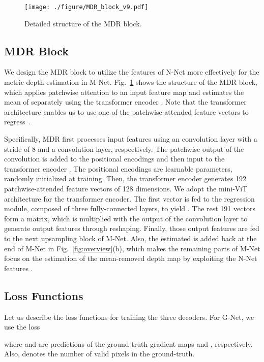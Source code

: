 \documentclass[runningheads]{llncs}
\begin{document}
\begin{figure}[!t]
    \centering
    \texttt{[image: ./figure/MDR\_block\_v9.pdf]}
    \caption{Detailed structure of the MDR block.}
    \label{fig:MDR_block}
\end{figure}

\subsection{MDR Block}
\label{sec:MDR_Block}
We design the MDR block to utilize the features  of N-Net more effectively for the metric depth estimation in M-Net. Fig.~\ref{fig:MDR_block} shows the structure of the MDR block, which applies patchwise attention to an input feature map and estimates the mean  of  separately using the transformer encoder \cite{dosovitskiy2020image}. Note that the transformer architecture enables us to use one of the patchwise-attended feature vectors to regress~.

Specifically, MDR first processes input features using an  convolution layer with a stride of 8 and a  convolution layer, respectively. The patchwise output of the  convolution is added to the positional encodings and then input to the transformer encoder \cite{dosovitskiy2020image}. The positional encodings are learnable parameters, randomly initialized at training. Then, the transformer encoder generates 192 patchwise-attended feature vectors of 128 dimensions. We adopt the mini-ViT architecture \cite{bhat2021adabins} for the transformer encoder. The first vector is fed to the regression module, composed of three fully-connected layers, to yield . The rest 191 vectors form a matrix, which is multiplied with the output of the  convolution layer to generate  output features through reshaping. Finally, those output features are fed to the next upsampling block of M-Net.
Also, the estimated  is added back at the end of M-Net in Fig.~\ref{fig:overview}(b), which makes the remaining parts of M-Net focus on the estimation of the mean-removed depth map  by exploiting the N-Net features .

\subsection{Loss Functions}
Let us describe the loss functions for training the three decoders. For G-Net, we use the  loss

where  and  are predictions of the ground-truth gradient maps  and , respectively. Also,  denotes the number of valid pixels in the ground-truth.
\end{document}
